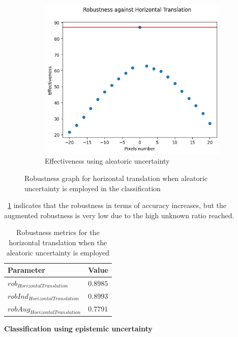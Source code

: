 \begin{figure}[h]
\begin{subfigure}{.33\textwidth}
		\centering
		\includegraphics[width=0.9\linewidth]{ImageFiles/EvalBNN/HT/AU/eff}
		\caption{Effectiveness using aleatoric uncertainty}
		\label{fig:ht_au_eff}
	\end{subfigure}
	\caption{Robustness graph for horizontal translation when aleatoric uncertainty is employed in the classification}
	\label{fig:ht_au}
\end{figure}

\Tab~\ref{table:rob_ht_au} indicates that the robustness in terms of accuracy increases, but the augmented robustness is very low due to the high unknown ratio reached.

\begin{table}[h]
	\centering
	\begin{tabular}{|| l | l ||} 
		\hline
		\textbf{Parameter} & \textbf{Value} \\
		\hline
		\hline
		$rob_{HorizontalTranslation}$ & $0.8985$ \\
		$robInd_{HorizontalTranslation}$ & $0.8993$ \\
		$robAug_{HorizontalTranslation}$ & $0.7791$ \\	
		\hline
	\end{tabular}	
	\caption{Robustness metrics for the horizontal translation when the aleatoric uncertainty is employed}
	\label{table:rob_ht_au}
\end{table}

\vspace{0.3cm}
\textbf{Classification using epistemic uncertainty}
\vspace{0.1cm}

